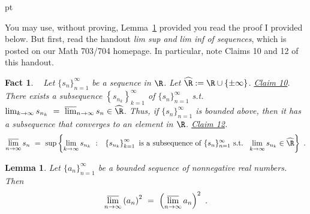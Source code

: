 \documentclass[11pt]{article} %
\theoremstyle{plain}  %
\newtheorem{lemma}[theorem]{Lemma}
\newtheorem*{factn}{Fact}
\theoremstyle{definition}  %
\theoremstyle{remark}  %
\newcommand{\hsp}[1]{\hskip #1 pt}
\newcommand{\vsp}[1]{\vskip #1 pt}
\newcommand{\lp}{\left(}
\newcommand{\rp}{\right)}
\newcommand{\lc}{\left\{}
\newcommand{\rc}{\right\}}
\begin{document}
\vsp{8}

\noindent 
 You may use, without proving,  Lemma~\ref{l:limsup} 
provided you read the proof I provided below.  
But first, read the handout \textit{lim sup and lim inf of sequences}, 
which is posted on our Math 703/704 homepage. 
In particular, note Claims 10 and 12 of this handout. 


\newcommand{\sn}{\{ s_n\}_{n=1}^\infty}
\newcommand{\lsup}{\varlimsup_{n\to\infty} s_n} 
\newcommand{\linf}{\varliminf_{n\to\infty} s_n}

\begin{factn} \ \newline 
Let $\{ s_n \}_{n=1}^\infty$ be a sequence in $\R$.  
Let $\widehat{\R} := \R \cup \lc \pm \infty \rc$. 
\newline
\underline{Claim 10}. 
There exists a subsequence $\lc s_{n_k} \rc_{k=1}^\infty$ of $\sn$  s.t.  
$\lim_{k\to\infty} s_{n_k} ~=~ \lsup \in \widehat{\R}$. 
\newline
Thus,  if $\sn$ is bounded above, 
then it has a subsequence that converges to an element in $\R$. 
\newline
\underline{Claim 12}. 
\begin{equation*}
\lsup ~=~ \sup \lc \lim_{k\to\infty} s_{n_k} \hsp{5} \colon \hsp{5}
 \lc s_{n_k} \rc_{k=1}^\infty 
\textrm{  is a   subsequence of  $\sn$ s.t.\  } 
\  \lim_{k\to\infty} s_{n_k} \in\widehat{\R} \rc  ~.
\end{equation*}
\end{factn}



\begin{lemma}
\label{l:limsup} 
Let $\{ a_n\}_{n=1}^\infty$ be a bounded sequence of nonnegative 
real numbers.  Then 
\begin{equation*}
\varlimsup_{n\to\infty} \lp a_n\rp^2 
~=~ 
\lp \varlimsup_{n\to\infty} a_n \rp^2~. 
\end{equation*}
\end{lemma} 
\end{document}
